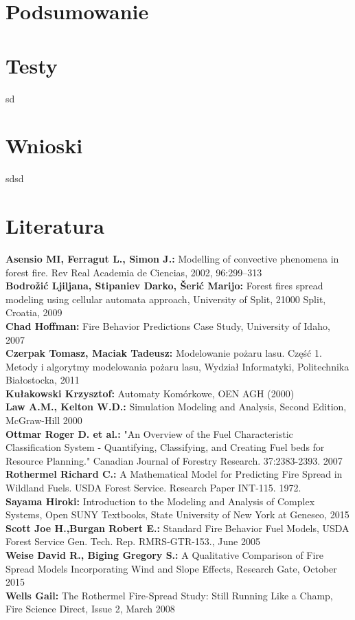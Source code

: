 \documentclass[a4paper, 11pt]{article}
\begin{document}
	\section*{Podsumowanie}
	\indent
	
	
	\begin{figure}[bt]
	\end{figure}
	\section{Testy}
	\indent
	sd
	\section{Wnioski}
	\indent
	
	sdsd
	\newpage
	\section{Literatura}
	
	\textbf{Asensio MI, Ferragut L., Simon J.:} Modelling of convective phenomena in forest fire. Rev Real Academia de Ciencias, 2002, 96:299–313\\
	\textbf{Bodrožić Ljiljana, Stipaniev Darko, Šerić Marijo:} Forest fires spread modeling using cellular automata approach, University of Split, 21000 Split, Croatia, 2009 \\
	\textbf{Chad Hoffman:} Fire Behavior Predictions Case Study, University of Idaho, 2007\\
	\textbf{Czerpak Tomasz, Maciak Tadeusz:} Modelowanie pożaru lasu. Część 1. Metody i algorytmy modelowania pożaru lasu, Wydział Informatyki, Politechnika Białostocka, 2011 \\
	\textbf{Kułakowski Krzysztof:} Automaty Komórkowe, OEN AGH (2000) \\
	\textbf{Law A.M., Kelton W.D.:} Simulation Modeling and Analysis, Second Edition, McGraw-Hill 2000\\
	\textbf{Ottmar Roger D. et al.:} "An Overview of the Fuel Characteristic Classification System - Quantifying, Classifying, and Creating Fuel beds for Resource Planning." Canadian Journal of Forestry Research. 37:2383-2393. 2007\\
	\textbf{Rothermel Richard C.:} A Mathematical Model for Predicting Fire Spread in Wildland Fuels. USDA Forest Service. Research Paper INT-115. 1972.\\
	\textbf{Sayama Hiroki:} Introduction to the Modeling and Analysis of Complex Systems, Open SUNY Textbooks, State University of New York at Geneseo, 2015\\	
	\textbf{Scott Joe H.,Burgan Robert E.:} Standard Fire Behavior Fuel Models, USDA Forest Service Gen. Tech. Rep. RMRS-GTR-153., June 2005\\	
	\textbf{Weise David R., Biging Gregory S.:} A Qualitative Comparison of Fire Spread Models Incorporating Wind and Slope Effects, Research Gate, October 2015\\
	\textbf{Wells Gail:} The Rothermel Fire-Spread Study: Still Running Like a Champ, Fire Science Direct, Issue 2, March 2008\\
	
	
	
	
\end{document}
